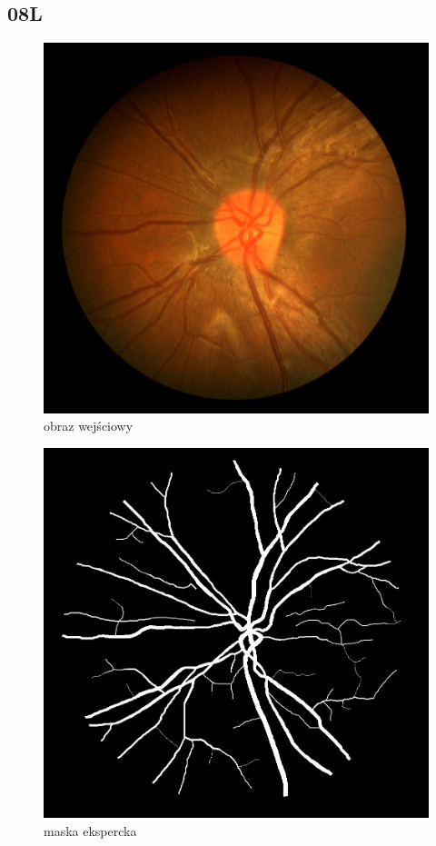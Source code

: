 \documentclass[polish,polish,a4paper]{article}
\begin{document}






		\subsection{08L}

\begin{figure}[!h]
	\centering
	\begin{minipage}{0.26\linewidth}
		\includegraphics[width=\linewidth]{../chase/Image_08L.jpg}
		\centering
			\small{obraz wejściowy}
	\end{minipage}
	\hfill
	\begin{minipage}{0.26\linewidth}
		\includegraphics[width=\linewidth]{../chase/Image_08L_1stHO.png}
		\centering
			\small{maska ekspercka}
	\end{minipage}
\end{figure}
\end{document}
